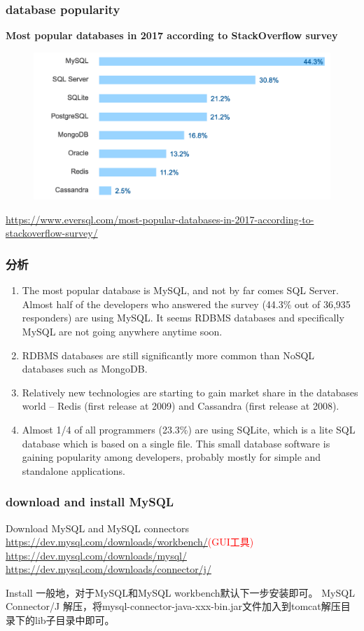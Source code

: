 \documentclass{beamer}
\begin{document}
\begin{frame}
\frametitle{database popularity}
\textbf{Most popular databases in 2017 according to StackOverflow survey}
\begin{figure}
\includegraphics[width=1\linewidth]{sql1.png}
\end{figure}
\url{https://www.eversql.com/most-popular-databases-in-2017-according-to-stackoverflow-survey/}
\end{frame}
\begin{frame}
\frametitle{分析}
\begin{enumerate}
\item
The most popular database is MySQL, and not by far comes SQL Server. Almost half of the developers who answered the survey (44.3\% out of 36,935 responders) are using MySQL. It seems RDBMS databases and specifically MySQL are not going anywhere anytime soon.

\item
RDBMS databases are still significantly more common than NoSQL databases such as MongoDB.
\item
Relatively new technologies are starting to gain market share in the databases world – Redis (first release at 2009) and Cassandra (first release at 2008).
\item
Almost 1/4 of all programmers (23.3\%) are using SQLite, which is a lite SQL database which is based on a single file. This small database software is gaining popularity among developers, probably mostly for simple and standalone applications.

\end{enumerate}
\end{frame}
\begin{frame}
\frametitle{download and install MySQL}
\begin{block}{Download MySQL and MySQL connectors}
\url{https://dev.mysql.com/downloads/workbench/}\textcolor{red}{(GUI工具)}
\url{https://dev.mysql.com/downloads/mysql/}
\url{https://dev.mysql.com/downloads/connector/j/}
\end{block}
\begin{block}{Install}
一般地，对于MySQL和MySQL workbench默认下一步安装即可。
MySQL Connector/J 解压，将mysql-connector-java-xxx-bin.jar文件加入到tomcat解压目录下的lib子目录中即可。
\end{block}
\end{frame}
\end{document}
